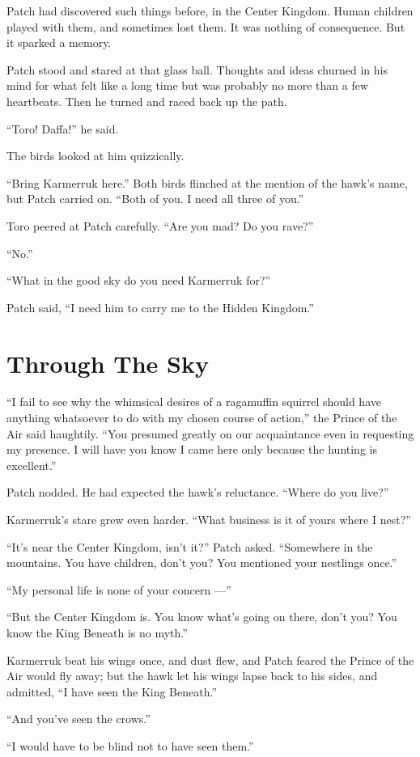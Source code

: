 \documentclass[ebook,oneside,openany,17pt]{memoir}
\renewcommand{\thechapter}{\Roman{chapter}}
\newcounter{sections}
\newcommand{\sections}[1]{%
  \section*{#1}
  \addtocounter{sections}{1}%
  \pdfbookmark[1]{#1}{section.\thechapter.\thesections}}
\begin{document}
Patch had discovered such things before, in the Center Kingdom. Human
children played with them, and sometimes lost them. It was nothing of
consequence. But it sparked a memory.

Patch stood and stared at that glass ball. Thoughts and ideas churned
in his mind for what felt like a long time but was probably no more
than a few heartbeats. Then he turned and raced back up the path.

“Toro! Daffa!” he said.

The birds looked at him quizzically.

“Bring Karmerruk here.” Both birds flinched at the mention of the
hawk’s name, but Patch carried on. “Both of you. I need all three of
you.”

Toro peered at Patch carefully. “Are you mad? Do you rave?”

“No.”

“What in the good sky do you need Karmerruk for?”

Patch said, “I need him to carry me to the Hidden Kingdom.”


\sections{Through The Sky}

“I fail to see why the whimsical desires of a ragamuffin squirrel
should have anything whatsoever to do with my chosen course of
action,” the Prince of the Air said haughtily. “You presumed greatly
on our acquaintance even in requesting my presence. I will have you
know I came here only because the hunting is excellent.”

Patch nodded. He had expected the hawk’s reluctance. “Where do you
live?”

Karmerruk’s stare grew even harder. “What business is it of yours
where I nest?”

“It’s near the Center Kingdom, isn’t it?” Patch asked. “Somewhere in
the mountains. You have children, don’t you? You mentioned your
nestlings once.”

“My personal life is none of your concern —”

“But the Center Kingdom is. You know what’s going on there, don’t you?
You know the King Beneath is no myth.”

Karmerruk beat his wings once, and dust flew, and Patch feared the
Prince of the Air would fly away; but the hawk let his wings lapse
back to his sides, and admitted, “I have seen the King Beneath.”

“And you’ve seen the crows.”

“I would have to be blind not to have seen them.”
\end{document}

